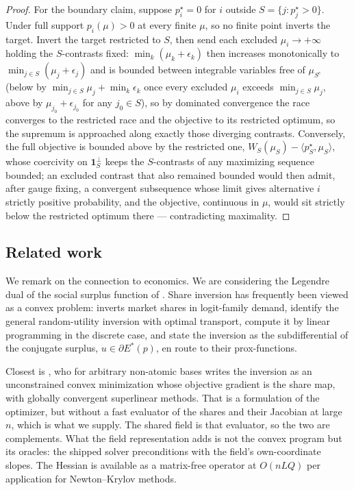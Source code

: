\documentclass[11pt]{article}
\begin{document}
\begin{proof}
For the boundary claim, suppose $p^{\star}_i=0$ for $i$ outside
$S=\{j:p^{\star}_j>0\}$. Under full support $p_i(\mu)>0$ at every finite
$\mu$, so no finite point inverts the target. Invert the target
restricted to $S$, then send each excluded $\mu_i\to+\infty$ holding the
$S$-contrasts fixed: $\min_k(\mu_k+\epsilon_k)$ then increases
monotonically to $\min_{j\in S}(\mu_j+\epsilon_j)$ and is bounded between
integrable variables free of $\mu_{S^c}$ (below by
$\min_{j\in S}\mu_j+\min_k\epsilon_k$ once every excluded $\mu_i$ exceeds
$\min_{j\in S}\mu_j$, above by $\mu_{j_0}+\epsilon_{j_0}$ for any
$j_0\in S$), so by dominated convergence the race converges to the
restricted race and the objective to its restricted optimum, so the
supremum is approached along exactly those diverging contrasts.
Conversely, the full objective is bounded above by the restricted one,
$W_S(\mu_S)-\langle p^{\star}_S,\mu_S\rangle$, whose coercivity on
$\mathbf{1}_S^{\perp}$ keeps the $S$-contrasts of any maximizing sequence
bounded; an excluded contrast that also remained bounded would then admit, after gauge fixing, a convergent
subsequence whose limit gives alternative $i$ strictly positive
probability, and the objective, continuous in $\mu$, would sit strictly
below the restricted optimum there --- contradicting maximality.
\end{proof}

\subsection{Related work}

We remark on the connection to economics. We are considering the Legendre dual of the social surplus function of
\citet{mcfadden1981}. Share inversion has frequently been viewed as a convex problem: \citet{berry1994} inverts market shares in
logit-family demand, \citet{galichon2022} identify the general random-utility
inversion with optimal transport, \citet{chiong2016} compute it by
linear programming in the discrete case, and \citet{muller2022} state
the inversion as the subdifferential of the conjugate surplus,
$u\in\partial E^{*}(p)$, en route to their prox-functions.

Closest is
\citet{li2018}, who for arbitrary non-atomic bases writes the inversion
as an unconstrained convex minimization whose objective gradient is the
share map, with globally convergent superlinear methods. That is a formulation
of the optimizer, but without a fast evaluator of the shares
and their Jacobian at large $n$, which is what we supply. The shared field is that evaluator, so
the two are complements. What the field representation adds is not the
convex program but its oracles: the shipped solver preconditions with
the field's own-coordinate slopes. The Hessian is available as a matrix-free operator at $O(nLQ)$ per application for Newton--Krylov methods.
\end{document}
